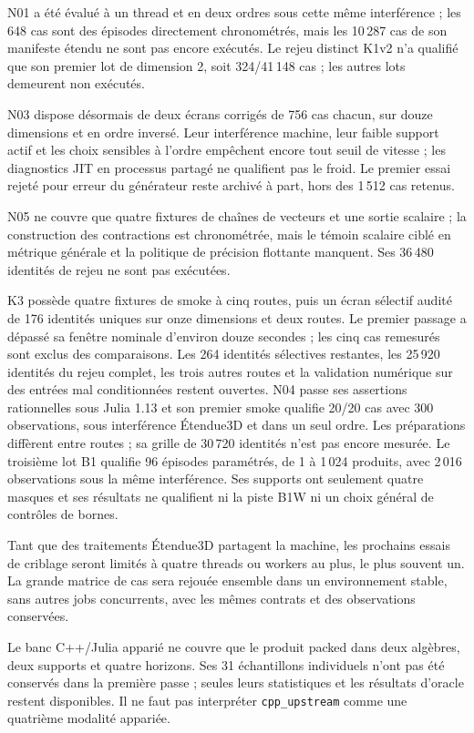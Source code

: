 \documentclass[11pt,a4paper]{article}
\newcommand{\code}[1]{\texttt{#1}}
\begin{document}
N01 a été évalué à un thread et en deux ordres sous cette même
interférence ; les 648 cas sont des épisodes directement chronométrés,
mais les 10\,287 cas de son manifeste étendu ne sont pas encore exécutés.
Le rejeu distinct K1v2 n'a qualifié que son premier lot de dimension 2,
soit 324/41\,148 cas ; les autres lots demeurent non exécutés.

N03 dispose désormais de deux écrans corrigés de 756 cas chacun,
sur douze dimensions et en ordre inversé. Leur interférence machine,
leur faible support actif et les choix sensibles à l'ordre empêchent
encore tout seuil de vitesse ; les diagnostics JIT en processus partagé
ne qualifient pas le froid. Le premier essai rejeté pour erreur du
générateur reste archivé à part, hors des 1\,512 cas retenus.

N05 ne couvre que quatre fixtures de chaînes de vecteurs et une sortie
scalaire ; la construction des contractions est chronométrée, mais le
témoin scalaire ciblé en métrique générale et la politique de précision
flottante manquent. Ses 36\,480 identités de rejeu ne sont pas exécutées.

K3 possède quatre fixtures de smoke à cinq routes, puis un écran
sélectif audité de 176 identités uniques sur onze dimensions et deux
routes. Le premier passage a dépassé sa fenêtre nominale d'environ
douze secondes ; les cinq cas remesurés sont exclus des comparaisons.
Les 264 identités sélectives restantes, les 25\,920 identités du
rejeu complet, les trois autres routes et la validation numérique sur
des entrées mal conditionnées restent ouvertes.
N04 passe ses assertions rationnelles sous Julia 1.13 et son premier
smoke qualifie 20/20 cas avec 300 observations, sous interférence
Étendue3D et dans un seul ordre. Les préparations diffèrent entre
routes ; sa grille de 30\,720 identités n'est pas encore mesurée.
Le troisième lot B1 qualifie 96 épisodes paramétrés, de 1 à 1\,024
produits, avec 2\,016 observations sous la même interférence. Ses
supports ont seulement quatre masques et ses résultats ne qualifient
ni la piste B1W ni un choix général de contrôles de bornes.

Tant que des traitements Étendue3D partagent la machine, les prochains
essais de criblage seront limités à quatre threads ou workers au plus,
le plus souvent un. La grande matrice de cas sera rejouée ensemble
dans un environnement stable, sans autres jobs concurrents, avec les
mêmes contrats et des observations conservées.

Le banc C++/Julia apparié ne couvre que le produit packed dans deux algèbres,
deux supports et quatre horizons. Ses 31 échantillons individuels n'ont pas
été conservés dans la première passe ; seules leurs statistiques et les
résultats d'oracle restent disponibles. Il ne faut pas interpréter
\code{cpp\_upstream} comme une quatrième modalité appariée.
\end{document}
